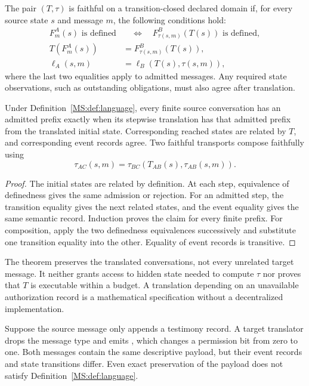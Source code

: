 \begin{MSdefinition}\label{MS:def:language}
The pair $(T,\tau)$ is faithful on a transition-closed declared domain if, for every source state $s$ and message $m$, the following conditions hold:
\begin{align*}
F^A_m(s)\text{ is defined}&\quad\Longleftrightarrow\quad
F^B_{\tau(s,m)}(T(s))\text{ is defined},\\
T(F^A_m(s))&=F^B_{\tau(s,m)}(T(s)),\\
\ell_A(s,m)&=\ell_B(T(s),\tau(s,m)),
\end{align*}
where the last two equalities apply to admitted messages. Any required state observations, such as outstanding obligations, must also agree after translation.
\end{MSdefinition}

\begin{MSproposition}\label{MS:prop:languagetrace}
Under Definition~\ref{MS:def:language}, every finite source conversation has an admitted prefix exactly when its stepwise translation has that admitted prefix from the translated initial state. Corresponding reached states are related by $T$, and corresponding event records agree. Two faithful transports compose faithfully using
\[
\tau_{AC}(s,m)=\tau_{BC}(T_{AB}(s),\tau_{AB}(s,m)).
\]
\end{MSproposition}
\begin{proof}
The initial states are related by definition. At each step, equivalence of definedness gives the same admission or rejection. For an admitted step, the transition equality gives the next related states, and the event equality gives the same semantic record. Induction proves the claim for every finite prefix. For composition, apply the two definedness equivalences successively and substitute one transition equality into the other. Equality of event records is transitive.
\end{proof}

The theorem preserves the translated conversations, not every unrelated target message. It neither grants access to hidden state needed to compute $\tau$ nor proves that $T$ is executable within a budget. A translation depending on an unavailable authorization record is a mathematical specification without a decentralized implementation.

\begin{MScounterexample}\label{MS:ex:speechact}
Suppose the source message  only appends a testimony record. A target translator drops the message type and emits , which changes a permission bit from zero to one. Both messages contain the same descriptive payload, but their event records and state transitions differ. Even exact preservation of the payload does not satisfy Definition~\ref{MS:def:language}.
\end{MScounterexample}

